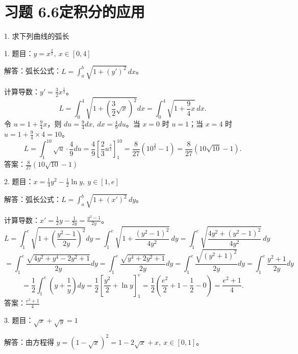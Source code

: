 \section*{习题 6.6\quad 定积分的应用}

1. 求下列曲线的弧长

1. 题目：\(y=x^{\frac{3}{2}},\ x\in[0,4]\)

解答：弧长公式：\(L=\int_{a}^{b}\sqrt{1+(y')^{2}}\,dx\)。

计算导数：\(y'=\frac{3}{2}x^{\frac{1}{2}}\)。
\[ L=\int_{0}^{4}\sqrt{1+\left(\frac{3}{2}\sqrt{x}\right)^{2}}dx=\int_{0}^{4}\sqrt{1+\frac{9}{4}x}\,dx. \]
令 \(u=1+\frac{9}{4}x\)，则 \(du=\frac{9}{4}dx,\ dx=\frac{4}{9}du\)。当 \(x=0\) 时 \(u=1\)；当 \(x=4\) 时 \(u=1+\frac{9}{4}\times4=10\)。
\[ L=\int_{1}^{10}\sqrt{u}\cdot\frac{4}{9}du=\frac{4}{9}\left[\frac{2}{3}u^{\frac{3}{2}}\right]_{1}^{10}=\frac{8}{27}\left(10^{\frac{3}{2}}-1\right)=\frac{8}{27}\left(10\sqrt{10}-1\right). \]
答案：\(\frac{8}{27}\left(10\sqrt{10}-1\right)\)

2. 题目：\(x=\frac{1}{4}y^{2}-\frac{1}{2}\ln y,\ y\in[1,e]\)

解答：弧长公式：\(L=\int_{a}^{b}\sqrt{1+(x')^{2}}\,dy\)。

计算导数：\(x'=\frac{1}{2}y-\frac{1}{2y}=\frac{y^{2}-1}{2y}\)。
\[ L=\int_{1}^{e}\sqrt{1+\left(\frac{y^{2}-1}{2y}\right)^{2}}dy=\int_{1}^{e}\sqrt{1+\frac{(y^{2}-1)^{2}}{4y^{2}}}\,dy=\int_{1}^{e}\sqrt{\frac{4y^{2}+(y^{2}-1)^{2}}{4y^{2}}}\,dy \]
\[ =\int_{1}^{e}\frac{\sqrt{4y^{2}+y^{4}-2y^{2}+1}}{2y}dy=\int_{1}^{e}\frac{\sqrt{y^{4}+2y^{2}+1}}{2y}dy=\int_{1}^{e}\frac{\sqrt{(y^{2}+1)^{2}}}{2y}dy=\int_{1}^{e}\frac{y^{2}+1}{2y}dy \]
\[ =\frac{1}{2}\int_{1}^{e}\left(y+\frac{1}{y}\right)dy=\frac{1}{2}\left[\frac{y^{2}}{2}+\ln y\right]_{1}^{e}=\frac{1}{2}\left(\frac{e^{2}}{2}+1-\frac{1}{2}-0\right)=\frac{e^{2}+1}{4}. \]
答案：\(\frac{e^{2}+1}{4}\)

3. 题目：\(\sqrt{x}+\sqrt{y}=1\)

解答：由方程得 \(y=(1-\sqrt{x})^{2}=1-2\sqrt{x}+x,\ x\in[0,1]\)。

